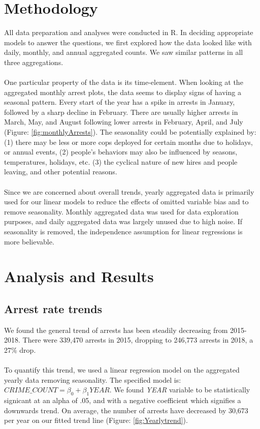 \documentclass[11pt]{article}\usepackage[]{graphicx}\usepackage[]{color}
\begin{document}
\section{Methodology}
All data preparation and analyses were conducted in R. In deciding appropriate models to answer the questions, we first explored how the data looked like with daily, monthly, and annual aggregated counts. We saw similar patterns in all three aggregations.
\\\\
One particular property of the data is its time-element. When looking at the aggregated monthly arrest plots, the data seems to display signs of having a seasonal pattern. Every start of the year has a spike in arrests in January, followed by a sharp decline in February. There are usually higher arrests in March, May, and August following lower arrests in February, April, and July (Figure: \ref{fig:monthlyArrests}). The seasonality could be potentially explained by: (1) there may be less or more cops deployed for certain months due to holidays, or annual events, (2) people's behaviors may also be influenced by seasons, temperatures, holidays, etc. (3) the cyclical nature of new hires and people leaving, and other potential reasons. 
\\\\
Since we are concerned about overall trends, yearly aggregated data is primarily used for our linear models to reduce the effects of omitted variable bias and to remove seasonality. Monthly aggregated data was used for data exploration purposes, and daily aggregated data was largely unused due to high noise.  If seasonality is removed, the independence assumption for linear regressions is more believable.

\section{Analysis and Results}
\subsection{Arrest rate trends}
We found the general trend of arrests has been steadily decreasing from 2015-2018. There were 339,470 arrests in 2015, dropping to 246,773 arrests in 2018, a 27\% drop.
\\\\
To quantify this trend, we used a linear regression model on the aggregated yearly data removing seasonality. The specified model is: $CRIME\_COUNT=\beta_0+\beta_1YEAR$. We found \textit{YEAR} variable to be statistically signicant at an alpha of .05, and with a negative coefficient which signifies a downwards trend. On average, the number of arrests have decreased by 30,673 per year on our fitted trend line (Figure: \ref{fig:Yearlytrend}).
\end{document}
